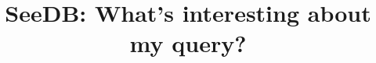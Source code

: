 \documentclass{sig-alternate}
\begin{document}
\newcommand{\SeeDB}{{\sf SeeDB}}
\newcommand{\calQ}{\mathcal{Q}}
\newcommand{\calR}{\mathcal{R}}
\newcommand{\att}[1]{{\text{#1}}}

\newtheorem{definition}{Definition}[section]
\newtheorem{example}[definition]{Example}
\newtheorem{goal}{Goal}[section]
\renewcommand{\baselinestretch}{0.995}





\newcommand{\squishlist}{
   \begin{list}{$\bullet$}
    { \setlength{\itemsep}{0pt}
      \setlength{\parsep}{2pt}
      \setlength{\topsep}{0pt}
      \setlength{\partopsep}{0pt}
      \leftmargin=25pt
\rightmargin=0pt
\labelsep=5pt
\labelwidth=10pt
\itemindent=0pt
\listparindent=0pt
\itemsep=\parsep
    }
}
\newcommand{\squishend}{\end{list}}

\newenvironment{denselist}{
    \begin{list}{\tiny{$\bullet$}}%
    {\setlength{\itemsep}{0ex} \setlength{\topsep}{0ex}
    \setlength{\parsep}{0pt} \setlength{\itemindent}{0pt}
    \setlength{\leftmargin}{0.5em}
    \setlength{\partopsep}{0pt}}}%
    {\end{list}}

\newcommand{\eat}[1]{}
\newcommand{\papertext}[1]{#1}
\newcommand{\techreport}[1]{}

\newcommand{\techreporttext}[1]{}
\newcommand{\stitle}[1]{\vspace{0.25em}\noindent\textbf{#1}}




\title{SeeDB: What's interesting about my query?\vspace{-5pt}}




\maketitle                                          

\vspace{-10pt}                                                     
                                             

\begin{abstract}

\end{abstract}



 

{\scriptsize


}
\end{document}
